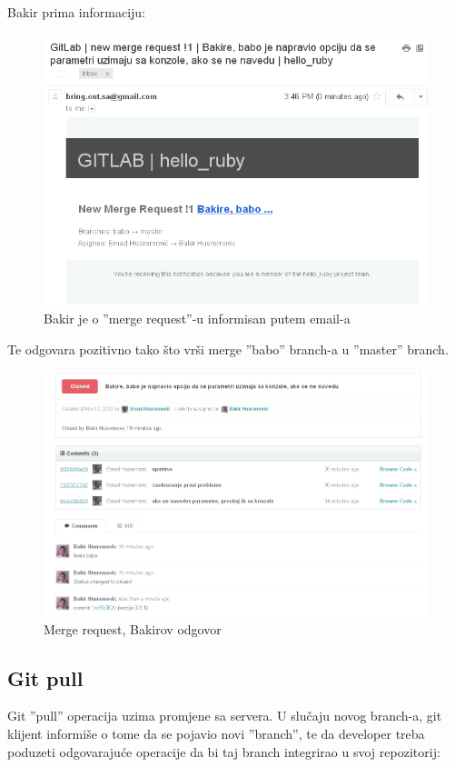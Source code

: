 \documentclass[times, utf8, seminar]{fit}
\begin{document}
Bakir prima informaciju:

\begin{figure}[H]
\centering
\includegraphics[width=12cm]{img/gitlab_merge_request_email_notification.png}
\caption{Bakir je o ''merge request''-u informisan putem email-a}
\end{figure}

Te odgovara pozitivno tako što vrši merge ''babo'' branch-a u ''master'' branch.
\begin{figure}[H]
\centering
\includegraphics[width=15cm]{img/gitlab_merge_request_answer.png}
\caption{Merge request, Bakirov odgovor}
\end{figure}

\subsection{Git pull}

Git ''pull'' operacija uzima promjene sa servera. U slučaju novog branch-a, git klijent informiše o tome da se pojavio novi ''branch'', te da developer treba poduzeti odgovarajuće operacije da bi taj branch integrirao u svoj repozitorij:
\end{document}
